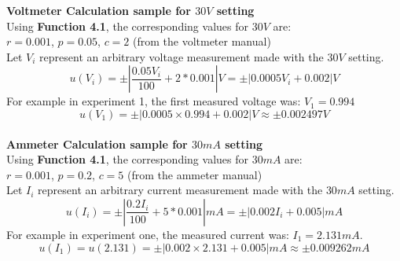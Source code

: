 \documentclass[
	letterpaper, %
	10pt, %
]{CSUniSchoolLabReport}
\begin{document}
\textbf{Voltmeter Calculation sample for $30V$ setting}\\
Using \textbf{Function 4.1}, the corresponding values for $30V$ are:\\
$r = 0.001$, $p = 0.05$, $c=2$ (from the voltmeter manual)\\
Let $V_i$ represent an arbitrary voltage measurement made with the $30V$ setting.\\
$$u(V_i) = \pm \left|\frac{0.05V_i }{100} +  2* 0.001\right|V = \pm\left|0.0005V_i + 0.002\right|V$$
For example in experiment 1, the first measured voltage was: $V_1=0.994$\\
$$u(V_1) = \pm \left|0.0005 \times 0.994 + 0.002\right|V \approx \pm 0.002497V$$\\
\textbf{Ammeter Calculation sample for $30mA$ setting}\\
Using \textbf{Function 4.1}, the corresponding values for $30mA$ are:\\
$r = 0.001$, $p = 0.2$, $c=5$ (from the ammeter manual)\\
Let $I_i$ represent an arbitrary current measurement made with the $30mA$ setting.\\
$$u(I_i) = \pm \left|\frac{0.2I_i }{100} +  5* 0.001\right|mA = \pm\left|0.002I_i + 0.005\right|mA$$
For example in experiment one, the measured current was: $I_1 = 2.131mA$.
$$u(I_1)= u(2.131) = \pm\left|0.002 \times 2.131 + 0.005\right|mA \approx \pm 0.009262mA$$\\
\end{document}

